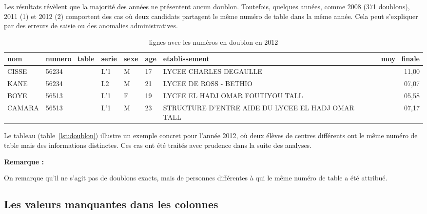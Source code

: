 Les résultats révèlent que la majorité des années ne présentent aucun doublon. Toutefois, quelques
années, comme 2008 (371 doublons), 2011 (1) et 2012 (2) comportent des cas où deux
candidats partagent le même numéro de table dans la même année. Cela peut s’expliquer par des
erreurs de saisie ou des anomalies administratives.

\begin{table}[h]
\scriptsize
\centering
\caption{lignes avec les numéros en doublon en 2012}
\label{tab:doublon}
\begin{tabular}{llllllr}
\toprule
nom & numero\_table & serie & sexe & age & etablissement & moy\_finale \\
\midrule
CISSE & 56234 & L'1 & M & 17 & LYCEE CHARLES DEGAULLE & 11,00 \\
KANE & 56234 & L2 & M & 21 & LYCEE DE ROSS - BETHIO & 07,07 \\
BOYE & 56513 & L'1 & F & 19 & LYCEE EL HADJ OMAR FOUTIYOU TALL & 05,58 \\
CAMARA & 56513 & L'1 & M & 23 & STRUCTURE D'ENTRE AIDE DU LYCEE EL HADJ OMAR TALL & 07,17 \\
\bottomrule
\end{tabular}
\end{table}

Le tableau (table~\ref{lst:doublon}) illustre un exemple concret pour l’année 2012, où deux élèves de centres différents ont le même numéro de table mais des informations distinctes. 
Ces cas ont été traités avec prudence dans la suite des analyses.

\textbf{Remarque :}

On remarque qu’il ne s’agit pas de doublons exacts, mais de personnes différentes à qui le même numéro de table a été attribué.

\newpage
\subsection{Les valeurs manquantes dans les colonnes}

